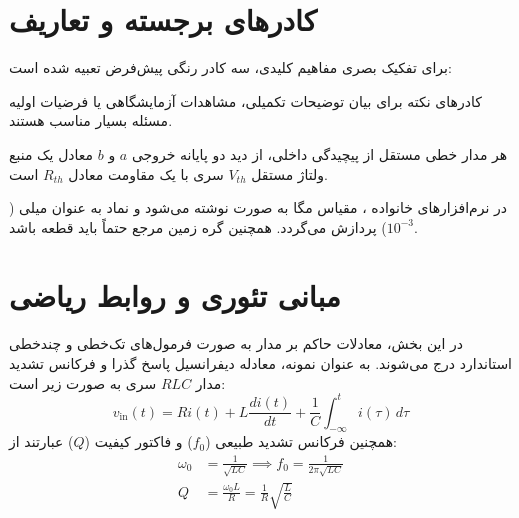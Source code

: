 \documentclass[12pt,a4paper]{article}
\begin{document}
\vspace{0.4cm}

\section{کادرهای برجسته و تعاریف}
برای تفکیک بصری مفاهیم کلیدی، سه کادر رنگی پیش‌فرض تعبیه شده است:

\begin{noteBox}
    کادرهای نکته برای بیان توضیحات تکمیلی، مشاهدات آزمایشگاهی یا فرضیات اولیه مسئله بسیار مناسب هستند.
\end{noteBox}

\begin{theoremBox}
    هر مدار خطی مستقل از پیچیدگی داخلی، از دید دو پایانه خروجی $a$ و $b$ معادل یک منبع ولتاژ مستقل $V_{th}$ سری با یک مقاومت معادل $R_{th}$ است.
\end{theoremBox}

\begin{warningBox}
    در نرم‌افزارهای خانواده ، مقیاس مگا به صورت  نوشته می‌شود و نماد  به عنوان میلی ($10^{-3}$) پردازش می‌گردد. همچنین گره زمین مرجع حتماً باید قطعه  باشد.
\end{warningBox}

\vspace{0.4cm}

\section{مبانی تئوری و روابط ریاضی}
در این بخش، معادلات حاکم بر مدار به صورت فرمول‌های تک‌خطی و چندخطی استاندارد درج می‌شوند. به عنوان نمونه، معادله دیفرانسیل پاسخ گذرا و فرکانس تشدید مدار $RLC$ سری به صورت زیر است:
\begin{equation}
    v_{\mathrm{in}}(t) = R i(t) + L \frac{di(t)}{dt} + \frac{1}{C}\int_{-\infty}^{t} i(\tau)\,d\tau
\end{equation}
همچنین فرکانس تشدید طبیعی ($f_0$) و فاکتور کیفیت ($Q$) عبارتند از:
\begin{align}
    \omega_0 &= \frac{1}{\sqrt{LC}} \implies f_0 = \frac{1}{2\pi\sqrt{LC}} \\
    Q &= \frac{\omega_0 L}{R} = \frac{1}{R}\sqrt{\frac{L}{C}}
\end{align}
\end{document}
